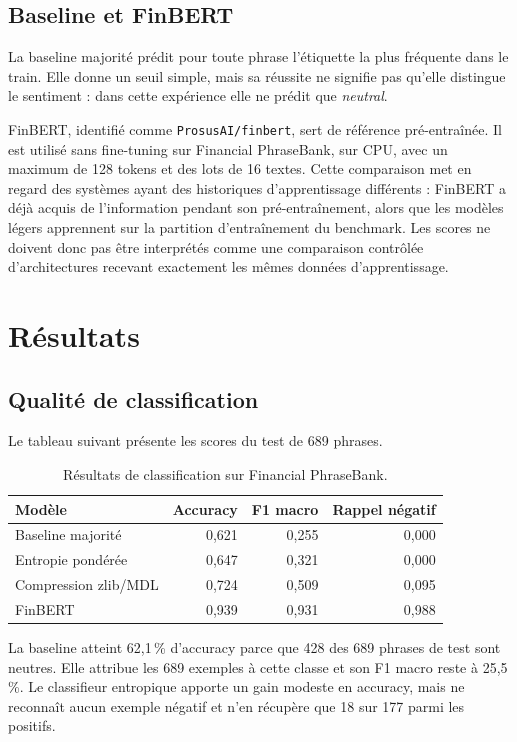 \documentclass[11pt,a4paper]{article}
\begin{document}
\subsection{Baseline et FinBERT}
La baseline majorité prédit pour toute phrase l'étiquette la plus fréquente
dans le train. Elle donne un seuil simple, mais sa réussite ne signifie pas
qu'elle distingue le sentiment : dans cette expérience elle ne prédit que
\emph{neutral}.

FinBERT, identifié comme \texttt{ProsusAI/finbert}, sert de référence
pré-entraînée. Il est utilisé sans fine-tuning sur Financial PhraseBank,
sur CPU, avec un maximum de 128 tokens et des lots de 16 textes. Cette
comparaison met en regard des systèmes ayant des historiques d'apprentissage
différents : FinBERT a déjà acquis de l'information pendant son
pré-entraînement, alors que les modèles légers apprennent sur la partition
d'entraînement du benchmark. Les scores ne doivent donc pas être interprétés
comme une comparaison contrôlée d'architectures recevant exactement les mêmes
données d'apprentissage.

\section{Résultats}

\subsection{Qualité de classification}
Le tableau suivant présente les scores du test de 689 phrases.

\begin{table}[ht]
\centering
\caption{Résultats de classification sur Financial PhraseBank.}
\label{tab:resultats}
\begin{tabular}{lrrr}
\toprule
Modèle & Accuracy & F1 macro & Rappel négatif\\
\midrule
Baseline majorité & 0,621 & 0,255 & 0,000\\
Entropie pondérée & 0,647 & 0,321 & 0,000\\
Compression zlib/MDL & 0,724 & 0,509 & 0,095\\
FinBERT & 0,939 & 0,931 & 0,988\\
\bottomrule
\end{tabular}
\end{table}

La baseline atteint 62,1\,\% d'accuracy parce que 428 des 689 phrases de test
sont neutres. Elle attribue les 689 exemples à cette classe et son F1 macro
reste à 25,5\,\%. Le classifieur entropique apporte un gain modeste en
accuracy, mais ne reconnaît aucun exemple négatif et n'en récupère que 18
sur 177 parmi les positifs.
\end{document}
